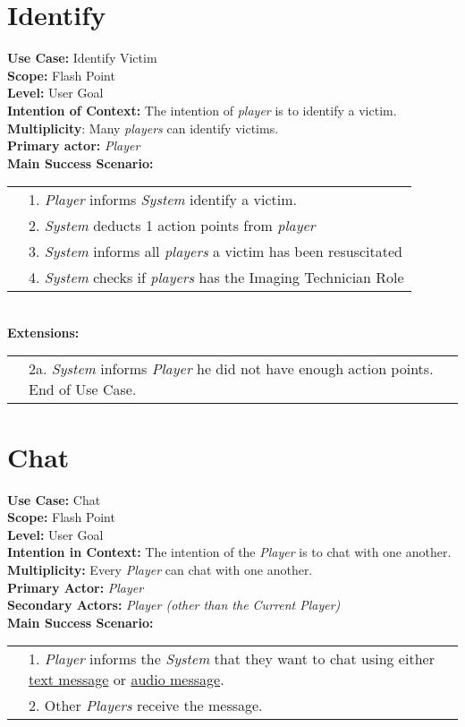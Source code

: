\documentclass{article}
\begin{document}
	\section*{Identify}
	\textbf{Use Case:} Identify Victim\\
	\textbf{Scope:} Flash Point\\
	\textbf{Level:} User Goal\\
	\textbf{Intention of Context:} The intention of \textit{player} is to identify a victim.\\
	\textbf{Multiplicity}: Many \textit{players} can identify victims.\\
	\textbf{Primary actor:} \textit{Player}\\
	\textbf{Main Success Scenario:}\\
	\begin{tabular}{l l}
		&1. \textit{Player} informs \textit{System} identify a victim.\\
		&2. \textit{System} deducts 1 action points from \textit{player}\\
		&3. \textit{System} informs all \textit{players} a victim has been resuscitated\\
		&4. \textit{System} checks if \textit{players} has the Imaging Technician Role\\
	\end{tabular}\\
	\textbf{Extensions:}\\
	\begin{tabular}{l l}
		&2a. \textit{System} informs \textit{Player} he did not have enough action points. End of Use Case.
	\end{tabular}
	\section*{Chat}
	\textbf{Use Case:} Chat\\
	\textbf{Scope:} Flash Point\\
	\textbf{Level:} User Goal\\
	\textbf{Intention in Context: } The intention of the \textit{Player} is to chat with one another.\\
	\textbf{Multiplicity: } Every \textit{Player} can chat with one another.\\
	\textbf{Primary Actor:} \textit{Player}\\
	\textbf{Secondary Actors:} \textit{Player (other than the Current Player)}\\
	\textbf{Main Success Scenario:}\\
	\begin{tabular}{l l}
		&1. \textit{Player} informs the \textit{System} that they want to chat using either \underline{text message} or \underline{audio message}.\\
		&2. Other \textit{Players} receive the message.
	\end{tabular}
\end{document}

